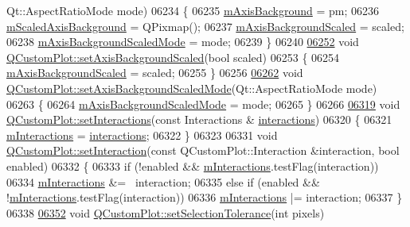 \begin{DoxyCode}
      Qt::AspectRatioMode mode)
06234 \{
06235   \hyperlink{a00116_ab93f80321dad937ebc6f2eaad1640c50}{mAxisBackground} = pm;
06236   \hyperlink{a00116_a9c0be35152f1cb89789149791f99044c}{mScaledAxisBackground} = QPixmap();
06237   \hyperlink{a00116_aa02865bc98b010e95c3aab39a3439ed0}{mAxisBackgroundScaled} = scaled;
06238   \hyperlink{a00116_a513c32c470438510a3341295b0ead04a}{mAxisBackgroundScaledMode} = mode;
06239 \}
06240 
\hypertarget{a00115_source_l06252}{}\hyperlink{a00116_a55ad8c13d7db8b5c2f15d694773a43a3}{06252} \textcolor{keywordtype}{void} \hyperlink{a00116_a55ad8c13d7db8b5c2f15d694773a43a3}{QCustomPlot::setAxisBackgroundScaled}(\textcolor{keywordtype}{bool} scaled)
06253 \{
06254   \hyperlink{a00116_aa02865bc98b010e95c3aab39a3439ed0}{mAxisBackgroundScaled} = scaled;
06255 \}
06256 
\hypertarget{a00115_source_l06262}{}\hyperlink{a00116_a82920d0db6cc36214dc4a9dfe386d1a1}{06262} \textcolor{keywordtype}{void} \hyperlink{a00116_a82920d0db6cc36214dc4a9dfe386d1a1}{QCustomPlot::setAxisBackgroundScaledMode}(Qt::AspectRatioMode 
      mode)
06263 \{
06264   \hyperlink{a00116_a513c32c470438510a3341295b0ead04a}{mAxisBackgroundScaledMode} = mode;
06265 \}
06266 
\hypertarget{a00115_source_l06319}{}\hyperlink{a00116_add9cc886ff5257f64fb4117cf6c135fe}{06319} \textcolor{keywordtype}{void} \hyperlink{a00116_add9cc886ff5257f64fb4117cf6c135fe}{QCustomPlot::setInteractions}(\textcolor{keyword}{const} Interactions &
      \hyperlink{a00116_aa9966a7b4022af4909a34d9a31f6b229}{interactions})
06320 \{
06321   \hyperlink{a00116_af8d040767753acc548b2368dd4150ae6}{mInteractions} = \hyperlink{a00116_aa9966a7b4022af4909a34d9a31f6b229}{interactions};
06322 \}
06323 
06331 \textcolor{keywordtype}{void} \hyperlink{a00116_af9af5370ddc6e57f3e15809c1576cc38}{QCustomPlot::setInteraction}(\textcolor{keyword}{const} QCustomPlot::Interaction &interaction, \textcolor{keywordtype}{
      bool} enabled)
06332 \{
06333   \textcolor{keywordflow}{if} (!enabled && \hyperlink{a00116_af8d040767753acc548b2368dd4150ae6}{mInteractions}.testFlag(interaction))
06334     \hyperlink{a00116_af8d040767753acc548b2368dd4150ae6}{mInteractions} &= ~interaction;
06335   \textcolor{keywordflow}{else} \textcolor{keywordflow}{if} (enabled && !\hyperlink{a00116_af8d040767753acc548b2368dd4150ae6}{mInteractions}.testFlag(interaction))
06336     \hyperlink{a00116_af8d040767753acc548b2368dd4150ae6}{mInteractions} |= interaction;
06337 \}
06338 
\hypertarget{a00115_source_l06352}{}\hyperlink{a00116_a4dc31241d7b09680950e19e5f971ed93}{06352} \textcolor{keywordtype}{void} \hyperlink{a00116_a4dc31241d7b09680950e19e5f971ed93}{QCustomPlot::setSelectionTolerance}(\textcolor{keywordtype}{int} pixels)

\end{DoxyCode}
